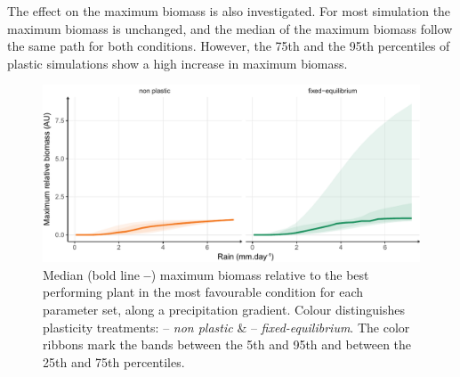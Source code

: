 \begin{figure}
    \classiccaptionstyle
{}\label{fig:total_BM}
\end{figure}

The effect on the maximum biomass is also investigated. For most simulation the maximum biomass is unchanged, and the median of the maximum biomass follow the same path for both conditions. However, the 75th and the 95th percentiles of plastic simulations show a high increase in maximum biomass.

\begin{figure}
\includegraphics[width = \textwidth]{./2_PP/Figures/Rain/gradient_rel_BM_pl_trend.pdf}
\caption[Maximum biomass relative along a precipitation gradient]{Median (bold line \textbf{--}) maximum biomass relative to the best performing plant in the most favourable condition for each parameter set, along a precipitation gradient.  Colour distinguishes plasticity treatments: \textcolor{myOrange}{-- \textit{non plastic}} \&  \textcolor{myGreen}{-- \textit{fixed-equilibrium}}. The color ribbons mark the bands between the 5th and 95th and between the 25th and 75th percentiles.}\label{fig:maximum_BM}
\end{figure}

